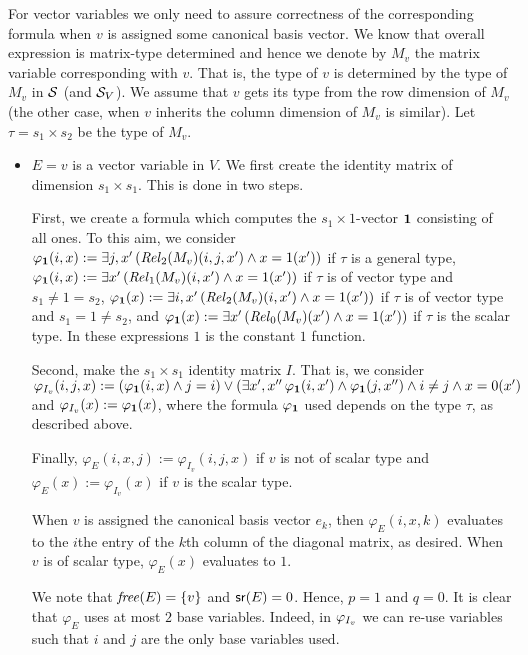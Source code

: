  For  vector variables we only need to assure correctness of the corresponding formula when $v$ is assigned
some canonical basis vector.  We know that overall expression is matrix-type determined and hence we denote by $M_v$ the 
matrix variable corresponding with $v$. That is, the type of $v$ is determined by the type of $M_v$ in $\mathcal{S}$ (and $\mathcal{S}_V$). We assume that $v$ gets its type from the row dimension of $M_v$ (the other case, when $v$ inherits the column dimension of $M_v$ is similar). Let $\tau=s_1\times s_2$ be the type of $M_v$.
 \begin{itemize}
\item $E = v$ is a vector variable in $V$. We first create the identity matrix of dimension $s_1\times s_1$. This is done in two steps.

First, we create a formula which computes the $s_1\times 1$-vector $\mathbf{1}$ consisting of all ones. To this aim, we consider $\varphi_{\mathbf{1}}(i,x):=\exists j, x'\, (\mathit{Rel}_2(M_v)(i,j,x')\land x=1(x'))$ if $\tau$ is a general type,
$\varphi_{\mathbf{1}}(i,x):=\exists  x'\, (\mathit{Rel}_1(M_v)(i,x')\land x=1(x'))$  if $\tau$ is of vector type  
and  $s_1 \neq 1 = s_2$, 
$\varphi_{\mathbf{1}}(x):=\exists  i, x'\, (\mathit{Rel}_2(M_v)(i,x')\land x=1(x'))$  if $\tau$ is of vector type and $s_1=1\neq s_2$, 
and $\varphi_{\mathbf{1}}(x):=\exists x'\, (\mathit{Rel}_0(M_v)(x')\land x=1(x'))$  if $\tau$ is the scalar type. In these expressions $1$  is the constant $1$ function.

Second, make the $s_1\times s_1$ identity matrix $I$. That is, we consider $\varphi_{I_v}(i,j,x):=(\varphi_{\mathbf{1}}(i,x)\land j=i)\vee (\exists x',x''\, \varphi_{\mathbf{1}}(i,x')\land\varphi_{\mathbf{1}}(j,x'')\land i\neq j \land x=0(x')$  and  $\varphi_{I_v}(x):=\varphi_{\mathbf{1}}(x)$, where the formula $\varphi_{\mathbf{1}}$ used depends on the type $\tau$, as described above.

Finally, $\varphi_E(i,x,j):=\varphi_{I_v}(i,j,x)$ if $v$ is not of scalar type and
$\varphi_E(x):=\varphi_{I_v}(x)$ if $v$ is the scalar type.

When $v$ is assigned the canonical basis vector $e_k$, then  $\varphi_E(i,x,k)$ evaluates to the $i$the entry of the $k$th column of the diagonal matrix, as desired. When $v$ is of scalar type, $\varphi_E(x)$ evaluates to $1$.

 We note that $\operatorname{\mathit{free}}(E)=\{v\}$ and $\mathsf{sr}(E)=0$.  Hence, $p=1$ and $q=0$. It is clear that $\varphi_E$ uses at most $2$ base variables. Indeed,
 in $\varphi_{I_v}$ we can re-use variables such that $i$ and $j$ are the only base variables used.

 \end{itemize}
